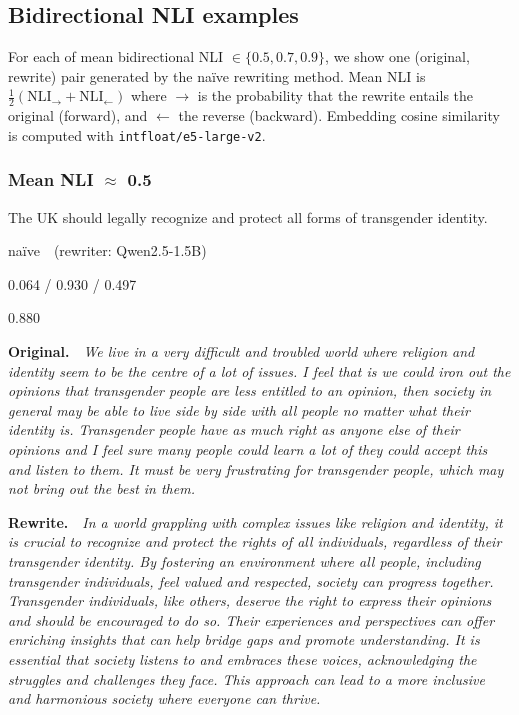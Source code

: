 \subsection{Bidirectional NLI examples}\label{app:nli-examples}

For each of mean bidirectional NLI $\in \{0.5, 0.7, 0.9\}$, we show one (original, rewrite) pair generated by the na\"ive rewriting method. Mean NLI is $\tfrac{1}{2}(\mathrm{NLI}_{\rightarrow} + \mathrm{NLI}_{\leftarrow})$ where $\rightarrow$ is the probability that the rewrite entails the original (forward), and $\leftarrow$ the reverse (backward). Embedding cosine similarity is computed with \texttt{intfloat/e5-large-v2}.

\subsubsection*{Mean NLI $\approx$ 0.5}

\begin{description}\setlength{\itemsep}{0pt}\setlength{\parsep}{0pt}
  \item[Proposition] The UK should legally recognize and protect all forms of transgender identity.
  \item[Method] na\"ive~~(rewriter: Qwen2.5-1.5B)
  \item[NLI fwd / bwd / mean] 0.064 / 0.930 / 0.497
  \item[Embedding cosine] 0.880
\end{description}

\noindent\textbf{Original.}~~\textit{We live in a very difficult and troubled world where religion and identity seem to be the centre of a lot of issues. I feel that is we could iron out the opinions that transgender people are less entitled to an opinion, then society in general may be able to live side by side with all people no matter what their identity is. Transgender people have as much right as anyone else of their opinions and I feel sure many people could learn a lot of they could accept this and listen to them. It must be very frustrating for transgender people, which may not bring out the best in them.}

\noindent\textbf{Rewrite.}~~\textit{In a world grappling with complex issues like religion and identity, it is crucial to recognize and protect the rights of all individuals, regardless of their transgender identity. By fostering an environment where all people, including transgender individuals, feel valued and respected, society can progress together. Transgender individuals, like others, deserve the right to express their opinions and should be encouraged to do so. Their experiences and perspectives can offer enriching insights that can help bridge gaps and promote understanding. It is essential that society listens to and embraces these voices, acknowledging the struggles and challenges they face. This approach can lead to a more inclusive and harmonious society where everyone can thrive.}

